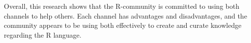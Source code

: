 Overall, this research shows that the R-community is committed to using both channels to help others. Each channel has advantages and disadvantages, and the
community appears to be using both effectively to create and curate knowledge regarding the R language.










